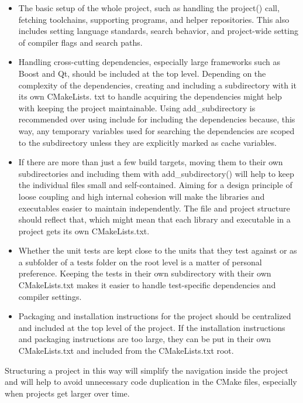 \begin{itemize}
\item 
The basic setup of the whole project, such as handling the project() call, fetching toolchains, supporting programs, and helper repositories. This also includes setting language standards, search behavior, and project-wide setting of compiler flags and search paths.

\item 
Handling cross-cutting dependencies, especially large frameworks such as Boost and Qt, should be included at the top level. Depending on the complexity of the  dependencies, creating and including a subdirectory with it its own CMakeLists. txt to handle acquiring the dependencies might help with keeping the project maintainable. Using add\_subdirectory is recommended over using include for including the dependencies because, this way, any temporary variables used for searching the dependencies are scoped to the subdirectory unless they are explicitly marked as cache variables.

\item 
If there are more than just a few build targets, moving them to their own subdirectories and including them with add\_subdirectory() will help to keep the individual files small and self-contained. Aiming for a design principle of loose coupling and high internal cohesion will make the libraries and executables easier to maintain independently. The file and project structure should reflect that, which might mean that each library and executable in a project gets its own CMakeLists.txt.

\item 
Whether the unit tests are kept close to the units that they test against or as a subfolder of a tests folder on the root level is a matter of personal preference. Keeping the tests in their own subdirectory with their own CMakeLists.txt makes it easier to handle test-specific dependencies and compiler settings.

\item 
Packaging and installation instructions for the project should be centralized and included at the top level of the project. If the installation instructions and packaging instructions are too large, they can be put in their own CMakeLists.txt and included from the CMakeLists.txt root.
\end{itemize}

Structuring a project in this way will simplify the navigation inside the project and will help to avoid unnecessary code duplication in the CMake files, especially when projects get larger over time.

